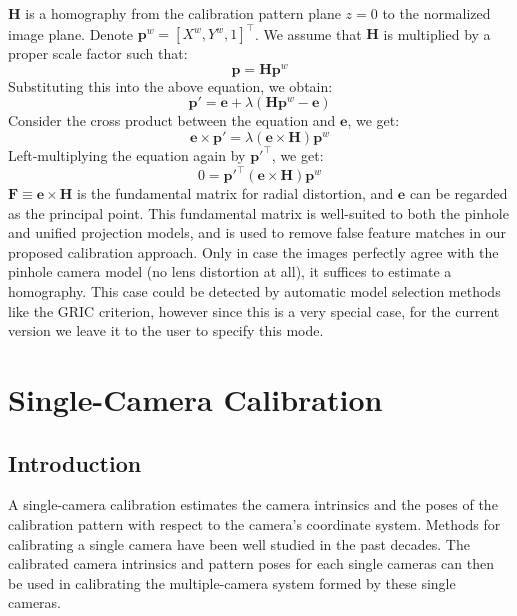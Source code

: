 \documentclass{report}
\begin{document}
$\mathbf{H}$ is a homography from the calibration pattern plane $z = 0$ to the normalized image plane. Denote $\mathbf{p}^w = [X^w, Y^w, 1]^\top$. We assume that $\mathbf{H}$ is multiplied by a proper scale factor such that: 
\begin{equation}
\mathbf{p} = \mathbf{H} \mathbf{p}^w
\end{equation}
Substituting this into the above equation, we obtain: 
\begin{equation}
\mathbf{p}' = \mathbf{e} + \lambda (\mathbf{H} \mathbf{p}^w - \mathbf{e})
\end{equation}
Consider the cross product between the equation and $\mathbf{e}$, we get:
\begin{equation}
{}\mathbf{e} \times \mathbf{p}' = \lambda (\mathbf{e} \times \mathbf{H}) \mathbf{p}^w
\end{equation}
Left-multiplying the equation again by ${\mathbf{p}'}^\top$, we get:
\begin{equation}
0 = {\mathbf{p}'}^\top (\mathbf{e} \times \mathbf{H}) \mathbf{p}^w
\end{equation}
$\mathbf{F} \equiv \mathbf{e} \times \mathbf{H}$ is the fundamental matrix for radial distortion, and $\mathbf{e}$ can be regarded as the principal point. This fundamental matrix is well-suited to both the pinhole and unified projection models, and is used to remove false feature matches in our proposed calibration approach. Only in case the images perfectly agree with the pinhole camera model (no lens distortion at all), it suffices to estimate a homography.
This case could be detected by automatic model selection methods like the GRIC criterion\cite{torr1997assessment}, however since this is a very special case, for the current version we leave it to the user to specify this mode.

\chapter{Single-Camera Calibration}
\section{Introduction}
\label{singleSec}
A single-camera calibration estimates the camera intrinsics and the poses of the calibration pattern with respect to the camera's coordinate system. Methods for calibrating a single camera have been well studied in the past decades. The calibrated camera intrinsics and pattern poses for each single cameras can then be used in calibrating the multiple-camera system formed by these single cameras. 
\end{document}
